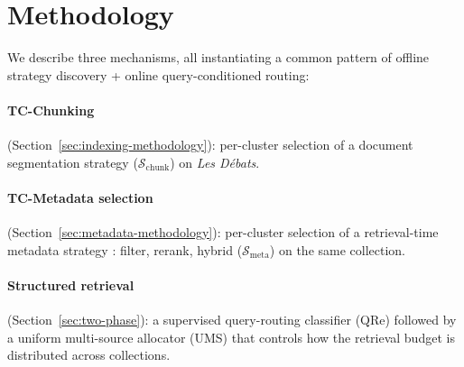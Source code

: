 %

\newcommand{\cmark}{\ding{51}}%
\newcommand{\xmark}{\ding{55}}%

\section{Methodology}
\label{sec:methodology}

We describe three mechanisms, all instantiating a common pattern of offline strategy discovery + online query-conditioned routing:

\paragraph{TC-Chunking} (Section~\ref{sec:indexing-methodology}):
per-cluster selection of a document segmentation strategy ($\mathcal{S}_{\text{chunk}}$) on
\textit{Les Débats}.
\paragraph{TC-Metadata selection} (Section~\ref{sec:metadata-methodology}):
per-cluster selection of a retrieval-time metadata strategy  : filter, rerank, hybrid ($\mathcal{S}_{\text{meta}}$) on the same collection.
\paragraph{Structured retrieval} (Section~\ref{sec:two-phase}):
a supervised query-routing classifier (QRe) followed by a
uniform multi-source allocator (UMS) that controls how the
retrieval budget is distributed across collections.

